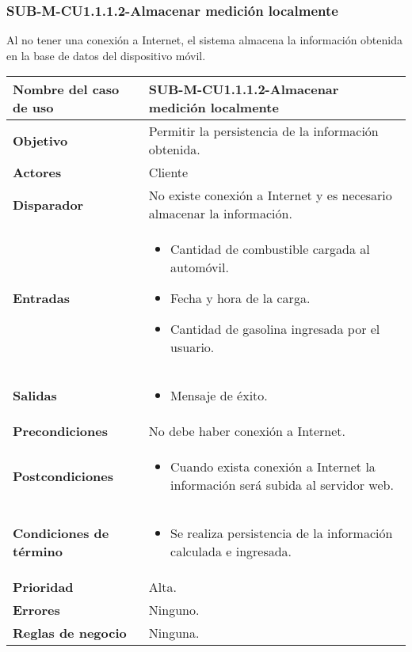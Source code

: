 \subsubsection{SUB-M-CU1.1.1.2-Almacenar medición localmente}\label{SUB-M-CU1.1.1.2}
Al no tener una conexión a Internet, el sistema almacena la información obtenida en la base de datos del dispositivo móvil.

\begin{longtable}{|J{5cm}|J{10.3cm}|}
	\hline
	\textbf{Nombre del caso de uso} &
		SUB-M-CU1.1.1.2-Almacenar medición localmente \\ \hline
	\textbf{Objetivo} &
		Permitir la persistencia de la información obtenida. \\ \hline
	\textbf{Actores} &
		Cliente \\ \hline 
	\textbf{Disparador} & 
		No existe conexión a Internet y es necesario almacenar la información. \\ \hline 
	\textbf{Entradas} & 
		\begin{itemize}
				\item Cantidad de combustible cargada al automóvil.
				\item Fecha y hora de la carga.
				\item Cantidad de gasolina ingresada por el usuario.
		\end{itemize}\\ \hline 
	\textbf{Salidas} & 
		\begin{itemize}
			\item Mensaje de éxito.
		\end{itemize} \\ \hline
	\textbf{Precondiciones} &
		No debe haber conexión a Internet.\\ \hline
	\textbf{Postcondiciones} &
		\begin{itemize}
			\item Cuando exista conexión a Internet la información será subida al servidor web.
		\end{itemize} \\ \hline
	\textbf{Condiciones de término} & 
		\begin{itemize}
			\item Se realiza persistencia de la información calculada e ingresada.
		\end{itemize} \\ \hline 
	\textbf{Prioridad} & 
		Alta. \\ \hline
	\textbf{Errores} & Ninguno.
		\\ \hline
	\textbf{Reglas de negocio} & Ninguna.
		 \\ \hline
\end{longtable}

